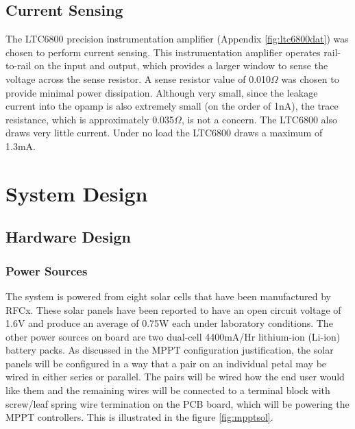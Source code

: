 \documentclass{article}
\numberwithin{figure}{section}
\numberwithin{equation}{section}
\begin{document}
{\subsection{Current Sensing} \label{sect:cur_just}
The LTC6800 precision instrumentation amplifier (Appendix \ref{fig:ltc6800dat}) was chosen to perform current sensing. This instrumentation amplifier operates rail-to-rail on the input and output, which provides a larger window to sense the voltage across the sense resistor. A sense resistor value of 0.010$\Omega$ was chosen to provide minimal power dissipation. Although very small, since the leakage current into the opamp is also extremely small (on the order of 1nA), the trace resistance, which is approximately 0.035$\Omega$, is not a concern. The LTC6800 also draws very little current. Under no load the LTC6800 draws a maximum of 1.3mA.

\section{System Design} \label{sect:sysarch}
\subsection{Hardware Design} \label{sect:hardwaredesign}

\subsubsection{Power Sources}

The system is powered from eight solar cells that have been manufactured by RFCx. These solar panels have been reported to have an open circuit voltage of 1.6V and produce an average of 0.75W each under laboratory conditions. The other power sources on board are two dual-cell 4400mA/Hr lithium-ion (Li-ion) battery packs. As discussed in the MPPT configuration justification, the solar panels will be configured in a way that a pair on an individual petal may be wired in either series or parallel. The pairs will be wired how the end user would like them and the remaining wires will be connected to a terminal block with screw/leaf spring wire termination on the PCB board, which will be powering the MPPT controllers. This is illustrated in the figure \ref{fig:mpptsol}.

}
\end{document}
